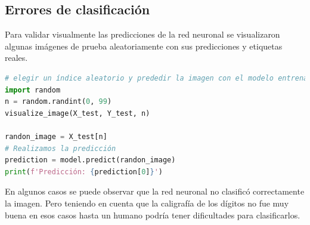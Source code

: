 \documentclass{article}
\begin{document}
    \subsection{Errores de clasificación}\label{subsec:errores-de-clasificacion}
    Para validar visualmente las predicciones de la red neuronal se visualizaron algunas imágenes
    de prueba aleatoriamente con sus predicciones y etiquetas reales.
    \begin{lstlisting}[language=Python, caption={Errores de clasificación}, label={lst:errores_clasificacion}]
# elegir un índice aleatorio y prededir la imagen con el modelo entrenado
import random
n = random.randint(0, 99)
visualize_image(X_test, Y_test, n)

randon_image = X_test[n]
# Realizamos la predicción
prediction = model.predict(randon_image)
print(f'Predicción: {prediction[0]}')
    \end{lstlisting}
    \clearpage
    \noindent
    En algunos casos se puede observar que la red neuronal no clasificó correctamente la imagen.
    Pero teniendo en cuenta que la caligrafía de los dígitos no fue muy buena en esos casos hasta un humano podría tener dificultades para clasificarlos.
\end{document}
